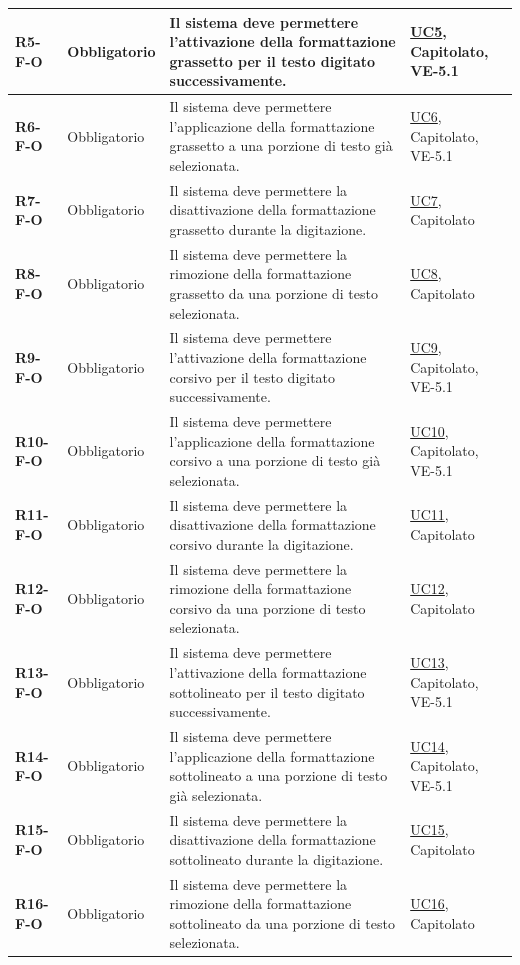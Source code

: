 \begin{longtable}{|p{2.5cm}|p{2.2cm}|p{6.8cm}|p{2.7cm}|}
	\textbf{R5-F-O} & Obbligatorio & Il sistema deve permettere l'attivazione della formattazione grassetto per il testo digitato successivamente. & \hyperlink{uc5}{UC5}, Capitolato, VE-5.1 \\ \hline
	\textbf{R6-F-O} & Obbligatorio & Il sistema deve permettere l'applicazione della formattazione grassetto a una porzione di testo già selezionata. & \hyperlink{uc6}{UC6}, Capitolato, VE-5.1 \\ \hline
	\textbf{R7-F-O} & Obbligatorio & Il sistema deve permettere la disattivazione della formattazione grassetto durante la digitazione. & \hyperlink{uc7}{UC7}, Capitolato \\ \hline
	\textbf{R8-F-O} & Obbligatorio & Il sistema deve permettere la rimozione della formattazione grassetto da una porzione di testo selezionata. & \hyperlink{uc8}{UC8}, Capitolato \\ \hline
	\textbf{R9-F-O} & Obbligatorio & Il sistema deve permettere l'attivazione della formattazione corsivo per il testo digitato successivamente. & \hyperlink{uc9}{UC9}, Capitolato, VE-5.1 \\ \hline
	\textbf{R10-F-O} & Obbligatorio & Il sistema deve permettere l'applicazione della formattazione corsivo a una porzione di testo già selezionata. & \hyperlink{uc10}{UC10}, Capitolato, VE-5.1 \\ \hline
	\textbf{R11-F-O} & Obbligatorio & Il sistema deve permettere la disattivazione della formattazione corsivo durante la digitazione. & \hyperlink{uc11}{UC11}, Capitolato \\ \hline
	\textbf{R12-F-O} & Obbligatorio & Il sistema deve permettere la rimozione della formattazione corsivo da una porzione di testo selezionata. & \hyperlink{uc12}{UC12}, Capitolato \\ \hline
	\textbf{R13-F-O} & Obbligatorio & Il sistema deve permettere l'attivazione della formattazione sottolineato per il testo digitato successivamente. & \hyperlink{uc13}{UC13}, Capitolato, VE-5.1 \\ \hline
	\textbf{R14-F-O} & Obbligatorio & Il sistema deve permettere l'applicazione della formattazione sottolineato a una porzione di testo già selezionata. & \hyperlink{uc14}{UC14}, Capitolato, VE-5.1 \\ \hline
	\textbf{R15-F-O} & Obbligatorio & Il sistema deve permettere la disattivazione della formattazione sottolineato durante la digitazione. & \hyperlink{uc15}{UC15}, Capitolato \\ \hline
	\textbf{R16-F-O} & Obbligatorio & Il sistema deve permettere la rimozione della formattazione sottolineato da una porzione di testo selezionata. & \hyperlink{uc16}{UC16}, Capitolato \\ \hline

\end{longtable}
